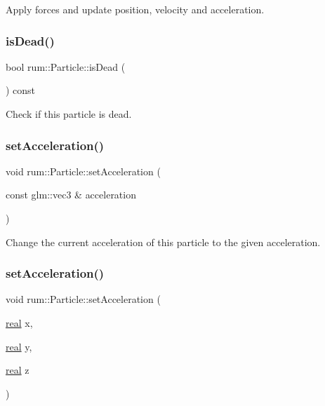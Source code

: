 Apply forces and update position, velocity and acceleration. \mbox{\label{classrum_1_1_particle_a95595b39aad9ae5a2146e05b836d4957}} 
\subsubsection{\texorpdfstring{is\+Dead()}{isDead()}}
{\footnotesize\ttfamily bool rum\+::\+Particle\+::is\+Dead (\begin{DoxyParamCaption}{ }\end{DoxyParamCaption}) const}

Check if this particle is dead. \mbox{\label{classrum_1_1_particle_a1e816cd9d1bf1bd670645c04800e12bb}} 
\subsubsection{\texorpdfstring{set\+Acceleration()}{setAcceleration()}\hspace{0.1cm}{\footnotesize\ttfamily [1/2]}}
{\footnotesize\ttfamily void rum\+::\+Particle\+::set\+Acceleration (\begin{DoxyParamCaption}\item[{const glm\+::vec3 \&}]{acceleration }\end{DoxyParamCaption})}

Change the current acceleration of this particle to the given acceleration. \mbox{\label{classrum_1_1_particle_a98cb259d81413be0128e173de809b7f1}} 
\subsubsection{\texorpdfstring{set\+Acceleration()}{setAcceleration()}\hspace{0.1cm}{\footnotesize\ttfamily [2/2]}}
{\footnotesize\ttfamily void rum\+::\+Particle\+::set\+Acceleration (\begin{DoxyParamCaption}\item[{\mbox{\hyperlink{namespacerum_a7e8cca23573d5eaead0f138cbaa4862c}{real}}}]{x,  }\item[{\mbox{\hyperlink{namespacerum_a7e8cca23573d5eaead0f138cbaa4862c}{real}}}]{y,  }\item[{\mbox{\hyperlink{namespacerum_a7e8cca23573d5eaead0f138cbaa4862c}{real}}}]{z }\end{DoxyParamCaption})}

